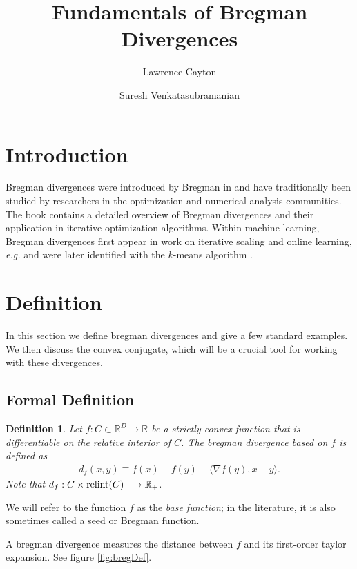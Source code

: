 \documentclass{article}
\title{Fundamentals of Bregman Divergences}
\author{Lawrence Cayton \and Suresh Venkatasubramanian}
\newtheorem{define}{Definition}
\newcommand{\R}{\mathbb{R}}
\newcommand{\relint}{\mbox{\textup{relint}}}
\begin{document}
\maketitle

\section{Introduction}
Bregman divergences were introduced by Bregman in \cite{b.67} and have
traditionally been studied by researchers in the optimization and
numerical analysis communities.  The book \cite{cz.97} contains a
detailed overview of Bregman divergences and their application in
iterative optimization algorithms.  Within machine learning, Bregman
divergences first appear in work on iterative scaling \cite{ldd.97}
and online learning, \textit{e.g.} 
\cite{gls.97,hw.98,aw.01} and were later identified with the $k$-means
algorithm \cite{bm.05}.   

\section{Definition}
In this section we define bregman divergences and give a few standard
examples.  We then discuss the convex conjugate, which will be a
crucial tool for working with these divergences.  

\subsection{Formal Definition}
\begin{define}
Let $f:C \subset \R^D \rightarrow \R$ be a strictly convex function that is
differentiable on the relative interior of $C$.  The bregman divergence based
on $f$ is defined as
\begin{align*}
  d_f(x,y) \equiv f(x) - f(y) - \langle \nabla f(y),x-y \rangle.  
\end{align*}
Note that $d_f:C \times \relint(C) \longrightarrow \R_+$.  
\end{define}
We will refer to the function $f$ as the \emph{base function}; in the
literature, it is also sometimes called a seed or Bregman function.  

A bregman divergence measures the distance between $f$ and its
first-order taylor expansion.  See figure \ref{fig:bregDef}.  
\end{document}
